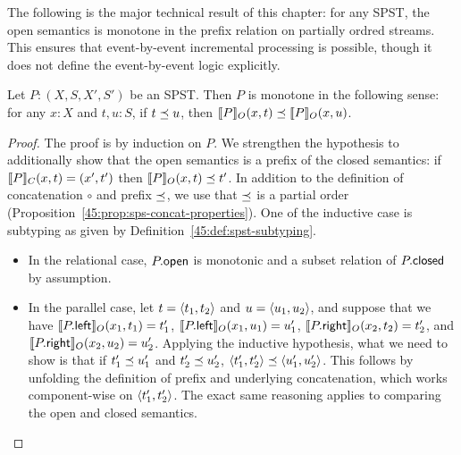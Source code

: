 The following is the major technical result of this chapter: for any SPST, the open semantics is monotone in the prefix relation on partially ordred streams.
This ensures that event-by-event incremental processing is possible, though it does not define the event-by-event logic explicitly.

\begin{theorem}
\label{45:thm:spst-monotonicity}
Let $P: (X, S, X', S')$ be an SPST.
Then $P$ is monotone in the following sense:
for any $x: X$ and $t, u: S$,
if $t\prefix u$,
then $\spstsemO{x}{t}{P} \prefix \spstsemO{x}{u}{P}$.
\end{theorem}
\begin{proof}
  The proof is by induction on $P$.
  We strengthen the hypothesis to additionally show that
  the open semantics is a prefix of the closed semantics:
  if $\spstsemC{x}{t}{P} = (x', t')$ then $\spstsemO{x}{t}{P} \prefix t'$.
  In addition to the definition of concatenation $\circ$
  and prefix $\prefix$,
  we use that $\prefix$ is a partial order
  (Proposition~\ref{45:prop:sps-concat-properties}).
  One of the inductive case is subtyping
  as given by Definition~\ref{45:def:spst-subtyping}.
  \begin{itemize}
  \item In the relational case,
  $\spstfield{P}{open}$ is monotonic and a subset relation
  of $\spstfield{P}{closed}$ by assumption.
  \item In the parallel case,
  let $t = \spspar{t_1}{t_2}$ and $u = \spspar{u_1}{u_2}$,
  and suppose that we have
  $\spstsemO{x_1}{t_1}{\spstfield{P}{left}} = t_1'$,
  $\spstsemO{x_1}{u_1}{\spstfield{P}{left}} = u_1'$,
  $\spstsemO{x_2}{t_2}{\spstfield{P}{right}} = t_2'$, and
  $\spstsemO{x_2}{u_2}{\spstfield{P}{right}} = u_2'$.
  Applying the inductive hypothesis, what we need to
  show is that if $t_1' \prefix u_1'$ and $t_2' \prefix u_2'$,
  $\spspar{t_1'}{t_2'} \prefix \spspar{u_1'}{u_2'}$.
  This follows by unfolding the definition of prefix and underlying concatenation,
  which works component-wise on $\spspar{t_1'}{t_2'}$.
  The exact same reasoning applies to
  comparing the open and closed semantics.


\end{itemize}
\end{proof}
